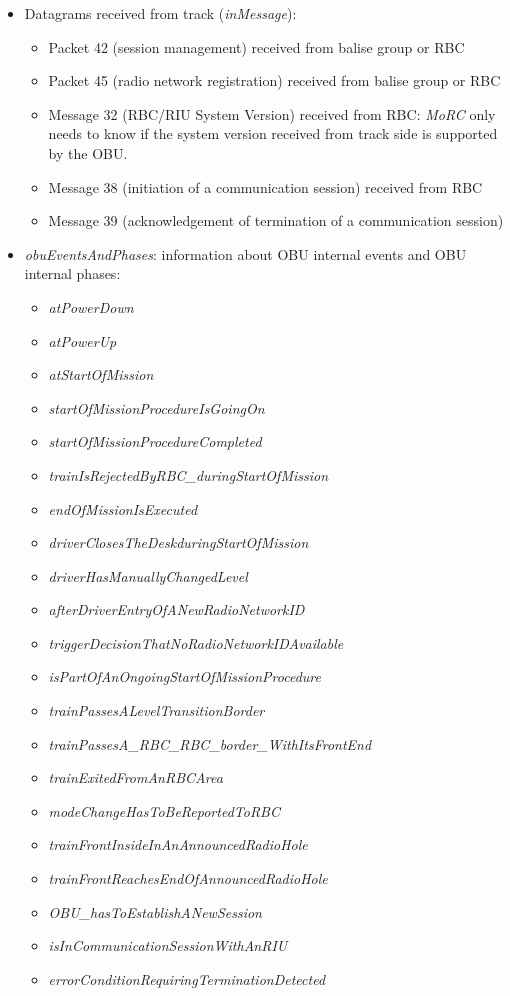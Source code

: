 \begin{itemize}
 \item Datagrams received from track (\textit{inMessage}):
 \begin{itemize}
  \item Packet 42 (session management) received from balise group or RBC
  \item Packet 45 (radio network registration) received from balise group or RBC
  \item Message 32 (RBC/RIU System Version) received from RBC: \textit{MoRC} only needs to know if the system version received from track side is supported by the OBU.
  \item Message 38 (initiation of a communication session) received from RBC
  \item Message 39 (acknowledgement of termination of a communication session)
 \end{itemize}

 \item \textit{obuEventsAndPhases}: information about OBU internal events and OBU internal phases:

  \begin{itemize}
   \item \textit{atPowerDown}
   \item \textit{atPowerUp}
   \item \textit{atStartOfMission}
   \item \textit{startOfMissionProcedureIsGoingOn}
   \item \textit{startOfMissionProcedureCompleted}
   \item \textit{trainIsRejectedByRBC\_duringStartOfMission}
   \item \textit{endOfMissionIsExecuted}
   \item \textit{driverClosesTheDeskduringStartOfMission}
   \item \textit{driverHasManuallyChangedLevel}
   \item \textit{afterDriverEntryOfANewRadioNetworkID}
   \item \textit{triggerDecisionThatNoRadioNetworkIDAvailable}
   \item \textit{isPartOfAnOngoingStartOfMissionProcedure}
   \item \textit{trainPassesALevelTransitionBorder}
   \item \textit{trainPassesA\_RBC\_RBC\_border\_WithItsFrontEnd}
   \item \textit{trainExitedFromAnRBCArea}
   \item \textit{modeChangeHasToBeReportedToRBC}
   \item \textit{trainFrontInsideInAnAnnouncedRadioHole}
   \item \textit{trainFrontReachesEndOfAnnouncedRadioHole}
   \item \textit{OBU\_hasToEstablishANewSession}
   \item \textit{isInCommunicationSessionWithAnRIU}
   \item \textit{errorConditionRequiringTerminationDetected}
  \end{itemize}


\end{itemize}

